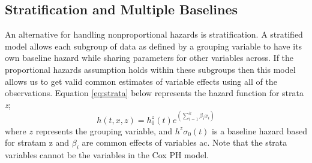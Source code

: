 \documentclass[12pt,letterpaper]{article}
\begin{document}
\subsection{Stratification and Multiple Baselines}
An alternative for handling nonproportional hazards is stratification.  A stratified model allows each subgroup of data as defined by a grouping variable to have its own baseline hazard while sharing parameters for other variables across. If the proportional hazards assumption holds within these subgroups then this model allows us to get valid common estimates of variable effects using all of the observations. Equation \ref{eq:strata} below represents the hazard function for strata {\it z};
\begin{equation}
	\label{eq:strata}
	h(t,x,z)=h^z_0(t)e^{(\sum_{i=1}^{k}\beta_ix_i)}
\end{equation}
where $z$ represents the grouping variable, and $h^z\sigma_0(t)$ is a baseline hazard based for stratam z and $\beta_i$ are common effects of variables ac. Note that the strata variables cannot be the variables in the Cox PH model.

\end{document}
